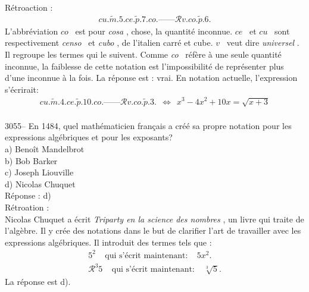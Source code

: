 \documentclass[letterpaper, 12pt]{article}
\begin{document}
R\'etroaction :\\
\begin{eqnarray*}
cu.\tilde{m}.5.ce.\tilde{p}.7.co.\textrm{------}\mathcal{R}v.co.\tilde{p}.6.
\end{eqnarray*}
L'abbr\'eviation \og $co$ \fg \ est pour \og \emph{cosa} \fg, chose, la quantit\'e inconnue. \og $ce$ \fg \ et \og $cu$ \fg \ sont respectivement \og \emph{censo} \fg  \ et \og \emph{cubo} \fg, de l'italien carr\'e et cube. \og $v$ \fg \ veut dire \og \emph{universel} \fg. Il regroupe les termes qui le suivent. Comme \og \emph{co} \fg \ r\'ef\`ere \`a une seule quantit\'e inconnue, la faiblesse de cette notation est l'impossibilit\'e de repr\'esenter plus d'une inconnue \`a la fois. La r\'eponse est : vrai. En notation actuelle, l'expression s'\'ecrirait:\\
\begin{eqnarray*}
cu.\tilde{m}.4.ce.\tilde{p}.10.co.\textrm{------}\mathcal{R}v.co.\tilde{p}.3. \ \ \Longleftrightarrow \ \ x^{3} - 4x^{2} + 10x = \sqrt{x + 3}
\end{eqnarray*}\\



3055-- En 1484, quel math\'ematicien fran\c cais a cr\'e\'e sa propre notation pour les expressions alg\'ebriques et pour les exposants?\\

a) Beno\^it Mandelbrot\\
b) Bob Barker\\
c) Joseph Liouville\\
d) Nicolas Chuquet\\

R\'eponse : d)\\

R\'etroation :\\
Nicolas Chuquet a \'ecrit \og \emph{Triparty en la science des nombres} \fg, un livre qui traite de l'alg\`ebre. Il y cr\'ee des notations dans le but de clarifier l'art de travailler avec les expressions alg\'ebriques.  Il introduit des termes tels que :\\
\begin{eqnarray*}
5^{2} \ \ \ \ \ \text{qui s'\'ecrit maintenant:} \ \ \ \ \ 5x^{2}.\\
\mathcal{R}^{3} 5 \ \ \ \ \ \text{qui s'\'ecrit maintenant:} \ \ \ \ \ \sqrt[3]{5}.
\end{eqnarray*}
La r\'eponse est d).\\
\end{document}
